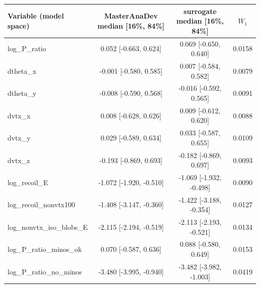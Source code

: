 \begin{tabular}{lccc}
\toprule
Variable (model space) & MasterAnaDev median [16\%, 84\%] & surrogate median [16\%, 84\%] & $W_1$ \\
\midrule
log\_P\_ratio & 0.052 [-0.663, 0.624] & 0.069 [-0.650, 0.640] & 0.0158 \\
dtheta\_x & -0.001 [-0.580, 0.585] & 0.007 [-0.584, 0.582] & 0.0079 \\
dtheta\_y & -0.008 [-0.590, 0.568] & -0.016 [-0.592, 0.565] & 0.0091 \\
dvtx\_x & 0.008 [-0.628, 0.626] & 0.009 [-0.612, 0.620] & 0.0088 \\
dvtx\_y & 0.029 [-0.589, 0.634] & 0.033 [-0.587, 0.655] & 0.0109 \\
dvtx\_z & -0.193 [-0.869, 0.693] & -0.182 [-0.869, 0.697] & 0.0093 \\
log\_recoil\_E & -1.072 [-1.920, -0.510] & -1.069 [-1.932, -0.498] & 0.0090 \\
log\_recoil\_nonvtx100 & -1.408 [-3.147, -0.360] & -1.422 [-3.188, -0.354] & 0.0127 \\
log\_nonvtx\_iso\_blobs\_E & -2.115 [-2.194, -0.519] & -2.113 [-2.193, -0.521] & 0.0134 \\
log\_P\_ratio\_minos\_ok & 0.070 [-0.587, 0.636] & 0.088 [-0.580, 0.649] & 0.0153 \\
log\_P\_ratio\_no\_minos & -3.480 [-3.995, -0.940] & -3.482 [-3.982, -1.003] & 0.0419 \\
\bottomrule
\end{tabular}
